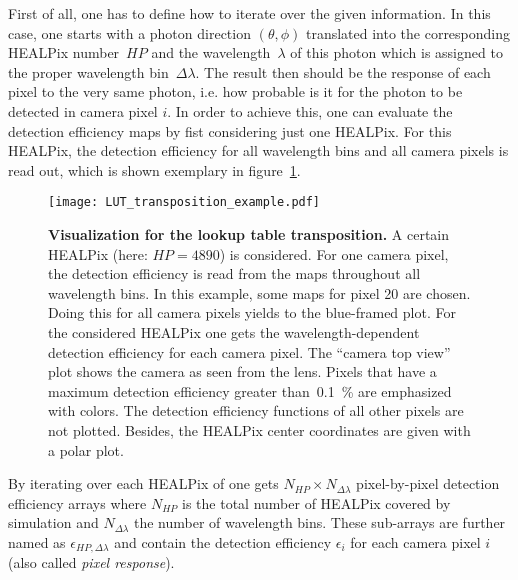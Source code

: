 First of all, one has to define how to iterate over the given information. In this case, one starts with a photon direction $(\theta,\phi)$ translated into the corresponding HEALPix number~$HP$ and the wavelength~$\lambda$ of this photon which is assigned to the proper wavelength bin~$\Delta\lambda$. The result then should be the response of each pixel to the very same photon, i.e. how probable is it for the photon to be detected in camera pixel $i$. In order to achieve this, one can evaluate the detection efficiency maps by fist considering just one HEALPix. For this HEALPix, the detection efficiency for all wavelength bins and all camera pixels is read out, which is shown exemplary in figure~\ref{lut:transpose_example}. 

\begin{figure}[H]
	\texttt{[image: LUT\_transposition\_example.pdf]}
	\caption[Visualization for the lookup table transposition]{\textbf{Visualization for the lookup table transposition.} A certain HEALPix (here: $HP=\num{4890}$) is considered. For one camera pixel, the detection efficiency is read from the maps throughout all wavelength bins. In this example, some maps for pixel \num{20} are chosen. Doing this for all camera pixels yields to the blue-framed plot. For the considered HEALPix one gets the wavelength-dependent detection efficiency for each camera pixel. The \enquote{camera top view} plot shows the camera as seen from the lens. Pixels that have a maximum detection efficiency greater than~\SI{0.1}{\percent} are emphasized with colors. The detection efficiency functions of all other pixels are not plotted. Besides, the HEALPix center coordinates are given with a polar plot.}
	\label{lut:transpose_example}
\end{figure}

By iterating over each HEALPix of one gets $N_{HP}\times N_{\Delta\lambda}$ pixel-by-pixel detection efficiency arrays where $N_{HP}$ is the total number of HEALPix covered by simulation and $N_{\Delta\lambda}$ the number of wavelength bins. These sub-arrays are further named as $\epsilon_{HP,\Delta\lambda}$ and contain the detection efficiency $\epsilon_i$ for each camera pixel $i$ (also called \textit{pixel response}). 

